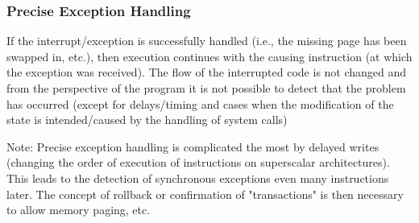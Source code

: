 \documentclass{beamer}
\begin{document}
\begin{frame}
\frametitle{Precise Exception Handling}

If the interrupt/exception is successfully handled (i.e., the missing page
has been swapped in, etc.), then execution continues
with the causing instruction (at which the exception was received).
The flow of the interrupted code is not changed and from the perspective
of the program it is not possible to detect that the problem has occurred
(except for delays/timing and cases when the modification of the state
is intended/caused by the handling of system calls)

\vspace{3mm}

Note: Precise exception handling is complicated the most by delayed
writes (changing the order of execution of instructions on superscalar
architectures). This leads to the detection of synchronous exceptions
even many instructions later. The concept of rollback or confirmation
of "transactions" is then necessary to allow memory paging, etc.

\end{frame}
\end{document}
